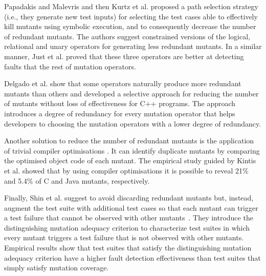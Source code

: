 Papadakis and Malevris \cite{papadakis2012mutation} and then Kurtz et al. \cite{kurtz2015static} proposed a path selection strategy (i.e., they generate new test inputs) for selecting the test cases able to effectively kill mutants using symbolic execution, and to consequently decrease the number of redundant mutants. 
The authors suggest constrained versions of the logical, relational and unary operators for generating less redundant mutants. 
In a similar manner, Just et al. \cite{just2012redundant,just2015higher} proved that these three operators are better at detecting faults that the rest of mutation operators.

Delgado et al. \cite{delgado2017assessment} show that some operators naturally produce more redundant mutants than others and
developed a selective approach for reducing the number of mutants without loss of effectiveness for C++ programs. 
The approach introduces a degree of redundancy for every mutation operator that helps developers to choosing the mutation operators with a lower degree of redundancy.

Another solution to reduce the number of redundant mutants is the application of trivial compiler optimisations \cite{papadakis2015trivial, kintis2017detecting,papadakis2019mutation}. 
It can identify duplicate mutants by comparing the optimised object code of each mutant. The empirical study guided by Kintis et al. \cite{kintis2017detecting} showed that by using compiler optimisations it is possible to reveal 21\% and 5.4\% of C and Java mutants, respectively.


Finally, Shin et al. suggest to avoid discarding redundant mutants but, instead, augment the test suite with additional test cases so that 
each mutant can trigger a test failure that cannot be observed with other mutants~\cite{Shin:TSE:DCriterion:2018}. 
They introduce the distinguishing mutation adequacy criterion to characterize test suites in which every mutant triggers a test failure that is not observed with other mutants.
Empirical results show that test suites that satisfy the distinguishing mutation adequacy criterion have a higher
 fault detection effectiveness than test suites that simply satisfy mutation coverage.



